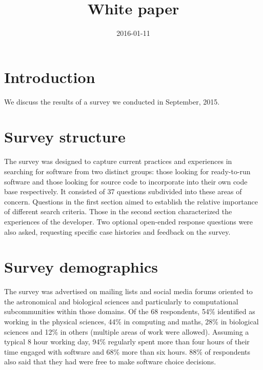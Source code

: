 \documentclass{casicswhitepaper}
\begin{document}
\title{White paper}
\date{2016-01-11}
\maketitle

\section{Introduction}

We discuss the results of a survey we conducted in September, 2015. 


\section{Survey structure}

The survey was designed to capture current practices and experiences in searching for software from two distinct groups: those looking for ready-to-run software and those looking for source code to incorporate into their own code base respectively. It consisted of 37 questions subdivided into these areas of concern. Questions in the first section aimed to establish the relative importance of different search criteria. Those in the second section characterized the experiences of the developer. Two optional open-ended response questions were also asked, requesting specific case histories and feedback on the survey.

\section{Survey demographics}

The survey was advertised on mailing lists and social media forums oriented to the astronomical and biological sciences and particularly to computational subcommunities within those domains. Of the 68 respondents, 54\% identified as working in the physical sciences, 44\% in computing and maths, 28\% in biological sciences and 12\% in others (multiple areas of work were allowed). Assuming a typical 8 hour working day, 94\% regularly spent more than four hours of their time engaged with software and 68\% more than six hours. 88\% of respondents also said that they had were free to make software choice decisions. 
\end{document}
